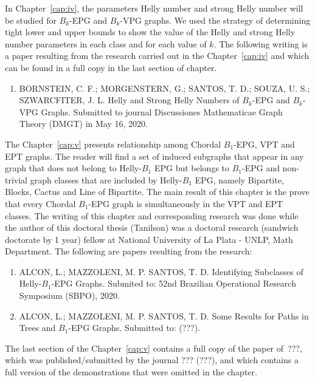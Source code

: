 In Chapter~\ref{cap:iv}, the parameters Helly number and strong Helly number will be studied for  $ B_k$-EPG and $ B_k$-VPG graphs. We used the strategy of determining tight lower and upper bounds to show the value of the Helly and strong Helly number parameters in each class and for each value of $k$. The following writing is a paper resulting from the research carried out in the Chapter~\ref{cap:iv} and which can be found in a full copy in the last section of chapter.

\begin{enumerate}
    \item BORNSTEIN, C. F.; MORGENSTERN, G.; SANTOS, T. D.; SOUZA, U. S.; SZWARCFITER, J. L.  Helly and Strong Helly Numbers of $B_k$-EPG and $B_k$-VPG Graphs. Submitted to journal Discussiones Mathematicae Graph Theory (DMGT) in  May 16, 2020. 
\end{enumerate}



The Chapter~\ref{cap:v} presents relationship among Chordal $B_1$-EPG, VPT and EPT graphs. The reader will find a set of induced subgraphs that appear in any graph that does not belong to Helly-$B_1$ EPG but belongs to $B_1$-EPG and non-trivial graph classes that are included by Helly-$B_1$ EPG, namely Bipartite, Blocks, Cactus and Line of Bipartite. The main result of this chapter is the prove that every Chordal $B_1$-EPG graph is simultaneously in the VPT and EPT classes.  The writing of this chapter and corresponding research was done while the author of this doctoral thesis (Tanilson) was a doctoral research (sandwich doctorate by 1 year) fellow at National University of La Plata - UNLP, Math Department. 
 The following are  papers resulting from the research:
 
 
 
\begin{enumerate}

     \item ALCON, L.; MAZZOLENI, M. P.  SANTOS, T. D. Identifying Subclasses of Helly-$B_1$-EPG Graphs. Submited to: 52nd  Brazilian Operational Research Symposium (SBPO), 2020.
     
     \item ALCON, L.; MAZZOLENI, M. P.  SANTOS, T. D. Some Results for Paths in Trees and $B_1$-EPG Graphs. Submitted to: (???).

\end{enumerate}

 
The last section of the Chapter~\ref{cap:v} contains a full copy of the paper of~???, which was published/submitted by the journal ??? (???), and which contains a full version of the demonstrations that were omitted in the chapter.


